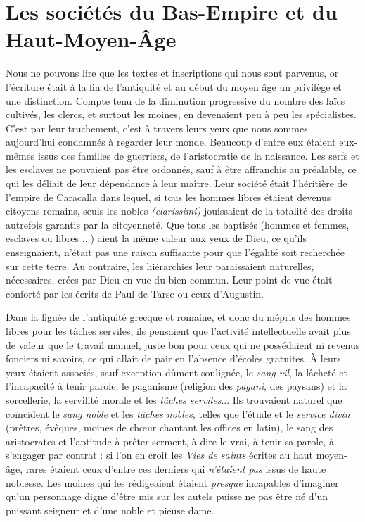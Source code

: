 
\chapter{Les sociétés du Bas-Empire et du Haut-Moyen-Âge}


 Nous ne pouvons lire que les textes et inscriptions qui nous sont parvenus, or l'écriture était à la fin de l'antiquité et au début du moyen âge un privilège et une distinction. Compte tenu de la diminution progressive du nombre des laïcs cultivés, les clercs, et surtout les moines, en devenaient peu à peu les spécialistes. C'est par leur truchement, c'est à travers leurs yeux que nous sommes aujourd'hui condamnés à regarder leur monde. Beaucoup d'entre eux étaient eux-mêmes issus des familles de guerriers, de l'aristocratie de la naissance. Les serfs et les esclaves ne pouvaient pas être ordonnés, sauf à être affranchis au préalable, ce qui les déliait de leur dépendance à leur maître. Leur société était l'héritière de l'empire de Caracalla dans lequel, si tous les hommes libres étaient devenus citoyens romains, seuls les nobles \emph{(clarissimi)} jouissaient de la totalité des droits autrefois garantis par la citoyenneté. Que tous les baptisés (hommes et femmes, esclaves ou libres ...) aient la même valeur aux yeux de Dieu, ce qu'ils enseignaient, n'était pas une raison suffisante pour que l'égalité soit recherchée sur cette terre. Au contraire, les hiérarchies leur paraissaient naturelles, nécessaires, crées par Dieu en vue du bien commun. Leur point de vue était conforté par les écrits de Paul de Tarse ou ceux d'Augustin.

 Dans la lignée de l'antiquité grecque et romaine, et donc du mépris des hommes libres pour les tâches serviles, ils pensaient que l'activité intellectuelle avait plus de valeur que le travail manuel, juste bon pour ceux qui ne possédaient ni revenus fonciers ni savoirs, ce qui allait de pair en l'absence d'écoles gratuites. À leurs yeux étaient associés, sauf exception dûment soulignée, le \emph{sang vil}, la lâcheté et l'incapacité à tenir parole, le paganisme (religion des \emph{pagani}, des paysans) et la sorcellerie, la servilité morale et les \emph{tâches serviles}... Ils trouvaient naturel que coïncident le \emph{sang noble} et les \emph{tâches nobles}, telles que l'étude et le \emph{service divin} (prêtres, évêques, moines de chœur chantant les offices en latin), le sang des aristocrates et l'aptitude à prêter serment, à dire le vrai, à tenir sa parole, à s'engager par contrat : si l'on en croit les \emph{Vies de saints} écrites au haut moyen-âge, rares étaient ceux d'entre ces derniers qui \emph{n'étaient pas} issus de haute noblesse. Les moines qui les rédigeaient étaient \emph{presque} incapables d'imaginer qu'un personnage digne d'être mis sur les autels puisse ne pas être né d'un puissant seigneur et d'une noble et pieuse dame. 

